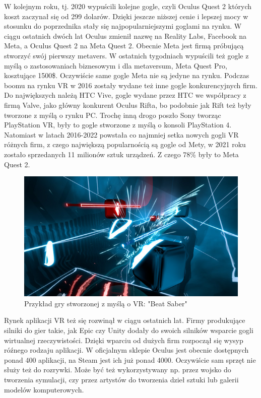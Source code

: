 \documentclass[a4paper,12pt,reqno]{article}
\begin{document}
W kolejnym roku, tj. 2020 wypuścili kolejne gogle, czyli Oculus Quest 2 których 
koszt zaczynał się od 299 dolarów. Dzięki jeszcze niższej cenie i lepszej mocy w 
stosunku do poprzednika stały się najpopularniejszymi goglami na rynku. W ciągu 
ostatnich dwóch lat Oculus zmienił nazwę na Reality Labs, Facebook na Meta, a Oculus 
Quest 2 na Meta Quest 2. Obecnie Meta jest firmą próbującą stworzyć swój pierwszy 
metavers. W ostatnich tygodniach wypuścili też gogle z myślą o zastosowaniach 
biznesowym i dla metaversum, Meta Quest Pro, kosztujące 1500\$. Oczywiście same 
gogle Meta nie są jedyne na rynku. Podczas boomu na rynku VR w 2016 zostały wydane 
też inne gogle konkurencyjnych firm. Do największych należą HTC Vive, gogle wydane 
przez HTC we współpracy z firmą Valve, jako główny konkurent Oculus Rifta, bo 
podobnie jak Rift też były tworzone z myślą o rynku PC. Trochę inną drogo poszło 
Sony tworząc PlayStation VR, były to gogle stworzone z myślą o konsoli PlayStation 
4. Natomiast w latach 2016-2022 powstała co najmniej setka nowych gogli VR różnych 
firm\cite{ilosc_urzadzen}, z czego największą popularnością są gogle od 
Mety\cite{popularnosc_gogli}, w 2021 roku zostało sprzedanych 11 milionów sztuk 
urządzeń. Z czego 78\% były to Meta Quest 2\cite{ilosc_urzadzen}.

\begin{figure}[H]%
\centering
\includegraphics[width=0.8\columnwidth]{graphics/BeatSaber.jpg}
\caption{Przykład gry stworzonej z myślą o VR: "Beat Saber"
\label{OpenBrush}}%
%
\qquad
\end{figure}  


Rynek aplikacji VR też się rozwinął w ciągu ostatnich lat. Firmy 
produkujące silniki do gier takie, jak Epic czy Unity dodały do swoich silników 
wsparcie gogli wirtualnej rzeczywistości. Dzięki wparciu od dużych firm rozpoczął się wysyp róźnego rodzaju aplikacji. W oficjalnym sklepie Oculus jest obecnie dostępnych ponad 400 
aplikacji\cite{liczba_gier_quest}, na Steam jest ich już ponad 
4000\cite{liczba_gier_steam}. Oczywiście sam sprzęt nie służy też do rozrywki. Może 
być też wykorzystywany np. przez wojsko do tworzenia symulacji, czy przez artystów 
do tworzenia dzieł sztuki lub galerii modelów komputerowych.
\end{document}
